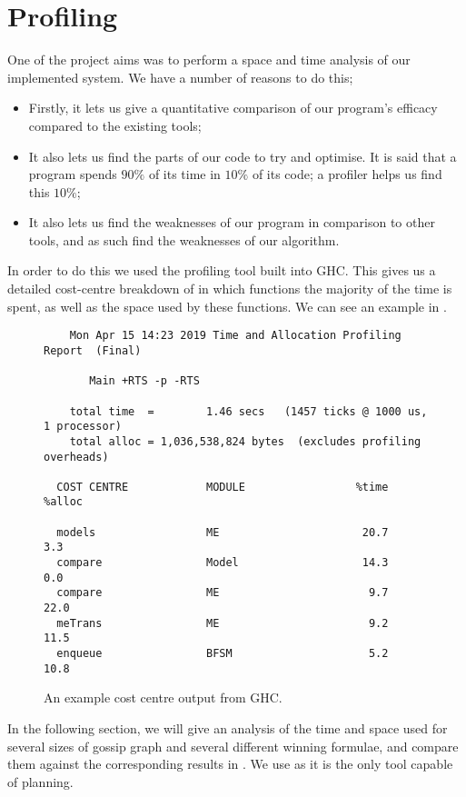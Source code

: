 \documentclass[10pt, a4paper]{report}
\begin{document}
\section{Profiling}

One of the project aims was to perform a space and time analysis of our
implemented system. We have a number of reasons to do this;

\begin{itemize}
\item Firstly, it lets us give a quantitative comparison of our program's
  efficacy compared to the existing tools;
\item It also lets us find the parts of our code to try and optimise. It is said
  that a program spends $90\%$ of its time in $10\%$ of its code; a profiler helps
  us find this $10\%$;
\item It also lets us find the weaknesses of our program in comparison to other
  tools, and as such find the weaknesses of our algorithm.
\end{itemize}

In order to do this we used the profiling tool built into GHC. This gives us a
detailed cost-centre breakdown of in which functions the majority of the time is
spent, as well as the space used by these functions. We can see an example in
.

\begin{figure}[h]
\begin{verbatim}
	Mon Apr 15 14:23 2019 Time and Allocation Profiling Report  (Final)

	   Main +RTS -p -RTS

	total time  =        1.46 secs   (1457 ticks @ 1000 us, 1 processor)
	total alloc = 1,036,538,824 bytes  (excludes profiling overheads)

  COST CENTRE            MODULE                 %time %alloc

  models                 ME                      20.7    3.3
  compare                Model                   14.3    0.0
  compare                ME                       9.7   22.0
  meTrans                ME                       9.2   11.5
  enqueue                BFSM                     5.2   10.8
\end{verbatim}
  \caption{An example cost centre output from GHC.}
  \label{fig:costcentre}
\end{figure}

In the following section, we will give an analysis of the time and space used
for several sizes of gossip graph and several different winning formulae, and
compare them against the corresponding results in \cite{GithubGossip}. We use
\cite{GithubGossip} as it is the only tool capable of planning.
\end{document}
